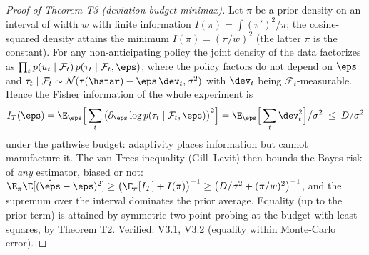 \begin{proof}[Proof of Theorem T3 (deviation-budget minimax)]
Let $\pi$ be a prior density on an interval of width $w$ with finite
information $I(\pi) = \int (\pi')^2/\pi$; the cosine-squared density
attains the minimum $I(\pi) = (\pi/w)^2$ (the latter $\pi$ is the
constant). For any non-anticipating policy the joint density of the data
factorizes as
$\prod_t p(u_t \mid \mathcal{F}_t)\, p(\tau_t \mid \mathcal{F}_t, \eps)$,
where the policy factors do not depend on $\eps$ and
$\tau_t \mid \mathcal{F}_t \sim \mathcal{N}(\tau(\hstar) - \eps\,\dev_t,
\sigma^2)$ with $\dev_t$ being $\mathcal{F}_t$-measurable. Hence the Fisher
information of the whole experiment is
\[
I_T(\eps) = \E_\eps\Big[\sum_t \big(\partial_\eps \log
p(\tau_t \mid \mathcal{F}_t, \eps)\big)^2\Big]
 = \E_\eps\Big[\sum_t \dev_t^2\Big]\big/\sigma^2 \;\le\; D/\sigma^2
\]
under the pathwise budget: adaptivity places information but cannot
manufacture it. The van Trees inequality (Gill--Levit) then bounds the
Bayes risk of \emph{any} estimator, biased or not:
$\E_\pi \E[(\hat\eps - \eps)^2] \ge \big(\E_\pi[I_T] + I(\pi)\big)^{-1}
\ge \big(D/\sigma^2 + (\pi/w)^2\big)^{-1}$, and the supremum over the
interval dominates the prior average. Equality (up to the prior term) is
attained by symmetric two-point probing at the budget with least squares,
by Theorem T2. Verified: V3.1, V3.2 (equality within Monte-Carlo error).
\end{proof}

